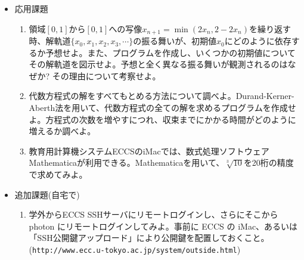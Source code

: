 \documentclass[11pt]{jarticle}
\begin{document}
\begin{itemize}
\item 応用課題
  \begin{enumerate}
  \item 領域$[0,1]$から$[0,1]$への写像$x_{n+1} = \min(2x_n,2-2x_n)$を繰り返す時、解軌道$\{x_0,x_1,x_2,x_3,\cdots\}$の振る舞いが、初期値$x_0$にどのように依存するか予想せよ。また、プログラムを作成し、いくつかの初期値についてその解軌道を図示せよ。予想と全く異なる振る舞いが観測されるのはなぜか? その理由について考察せよ。
  \item 代数方程式の解をすべてもとめる方法について調べよ。Durand-Kerner-Aberth法を用いて、代数方程式の全ての解を求めるプログラムを作成せよ。方程式の次数を増やすにつれ、収束までにかかる時間がどのように増えるか調べよ。
  \item 教育用計算機システムECCSのiMacでは、数式処理ソフトウェアMathematicaが利用できる。Mathematicaを用いて、$\sqrt[3]{10}$を20桁の精度で求めてみよ。
  \end{enumerate}  

\item 追加課題(自宅で)
  \begin{enumerate}
  \item 学外からECCS SSHサーバにリモートログインし、さらにそこから photon にリモートログインしてみよ。事前に ECCS の iMac、あるいは「SSH公開鍵アップロード」により公開鍵を配置しておくこと。(\verb+http://www.ecc.u-tokyo.ac.jp/system/outside.html+)
  \end{enumerate}

\end{itemize}
\end{document}
